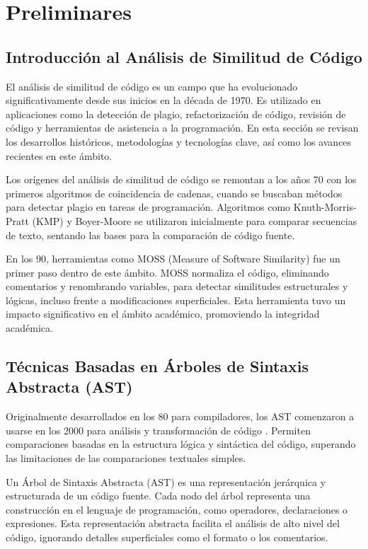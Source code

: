 \chapter{Preliminares}\label{chapter:state-of-the-art}

\section{Introducción al Análisis de Similitud de Código}
El análisis de similitud de código es un campo que ha evolucionado significativamente desde sus inicios en la década de 1970. Es utilizado en aplicaciones como la detección de plagio, refactorización de código, revisión de código y herramientas de asistencia a la programación. En esta sección se revisan los desarrollos históricos, metodologías y tecnologías clave, así como los avances recientes en este ámbito.

Los orígenes del análisis de similitud de código se remontan a los años 70 con los primeros algoritmos de coincidencia de cadenas, cuando se buscaban métodos para detectar plagio en tareas de programación. Algoritmos como Knuth-Morris-Pratt (KMP) \cite{knuth1977fast} y Boyer-Moore \cite{boyer1977fast} se utilizaron inicialmente para comparar secuencias de texto, sentando las bases para la comparación de código fuente.

En los 90, herramientas como MOSS (Measure of Software Similarity) \cite{aiken1994moss} fue un primer paso dentro de este ámbito. MOSS normaliza el código, eliminando comentarios y renombrando variables, para detectar similitudes estructurales y lógicas, incluso frente a modificaciones superficiales. Esta herramienta tuvo un impacto significativo en el ámbito académico, promoviendo la integridad académica.

\section{Técnicas Basadas en Árboles de Sintaxis Abstracta (AST)}

Originalmente desarrollados en los 80 para compiladores, los AST comenzaron a usarse en los 2000 para análisis y transformación de código \cite{aho1986compilers}. Permiten comparaciones basadas en la estructura lógica y sintáctica del código, superando las limitaciones de las comparaciones textuales simples.

Un Árbol de Sintaxis Abstracta (AST) es una representación jerárquica y estructurada de un código fuente. Cada nodo del árbol representa una construcción en el lenguaje de programación, como operadores, declaraciones o expresiones. Esta representación abstracta facilita el análisis de alto nivel del código, ignorando detalles superficiales como el formato o los comentarios.

